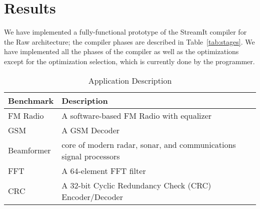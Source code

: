 \section{Results}
\label{sec:results}

We have implemented a fully-functional prototype of the StreamIt
compiler for the Raw architecture; the compiler phases are described
in Table~\ref{tab:stages}. We have implemented all the phases of the
compiler as well as the optimizations except for the optimization
selection, which is currently done by the programmer.

\begin{table}[t]
\begin{center}
\scriptsize
\begin{tabular}{|l|l|} \hline
Benchmark & Description\\
\hline \hline
FM Radio & A software-based FM Radio with equalizer\\
\hline
GSM & A GSM Decoder\\
\hline
Beamformer & core of modern radar, sonar, and communications signal processors \cite{pca}\\
\hline
FFT & A 64-element FFT filter \\
\hline
CRC & A 32-bit Cyclic Redundancy Check (CRC) Encoder/Decoder\\
\hline
\end{tabular}
\vspace{-6pt}
\caption{\protect\small Application Description}
\label{tab:benchmarks}
\vspace{-12pt}
\end{center}
\end{table}



%
%
%


